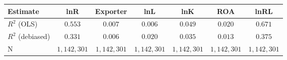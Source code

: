 \begin{tabular}{l*{6}{c}}
\hline\hline
 Estimate & lnR & Exporter & lnL & lnK & ROA & lnRL \\
\hline
\addlinespace $ R^2$ (OLS) & $0.553$ & $0.007$ & $0.006$ & $0.049$ & $0.020$ & $0.671$ \\
$ R^2$ (debiased) & $0.331$ & $0.006$ & $0.020$ & $0.035$ & $0.013$ & $0.375$ \\
N & $1,142,301$ & $1,142,301$ & $1,142,301$ & $1,142,301$ & $1,142,301$ & $1,142,301$ \\
\hline\hline
\end{tabular}
